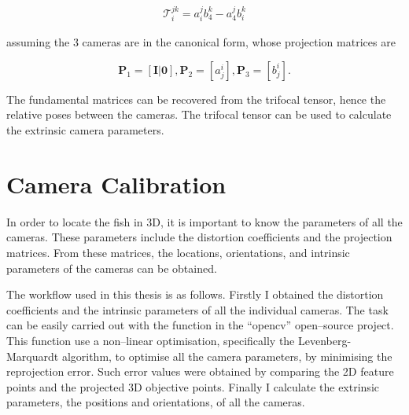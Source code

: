 \documentclass[11pt,twoside]{report}
\begin{document}
$$
\begin{aligned}
	\mathcal{T}_i^{jk} = a_i^j b_4^k - a_4^j b_i^k
\end{aligned}
$$

\noindent assuming the 3 cameras are in the canonical form, whose projection matrices are

$$
\mathbf{P}_1 = [\mathbf{I} | \mathbf{0}],
\mathbf{P}_2 = [a_j^i],
\mathbf{P}_3 = [b_j^i].
$$

The fundamental matrices can be recovered from the trifocal tensor, hence the relative poses between the cameras. The trifocal tensor can be used to calculate the extrinsic camera parameters.

\section{Camera Calibration}
\label{section:calibration}

In order to locate the fish in 3D, it is important to know the parameters of all the cameras. These parameters include the distortion coefficients and the projection matrices. From these matrices, the locations, orientations, and intrinsic parameters of the cameras can be obtained.

The workflow used in this thesis is as follows. Firstly I obtained the distortion coefficients and the intrinsic parameters of all the individual cameras. The task can be easily carried out with the  function in the ``opencv'' open--source project. This function use a non--linear optimisation, specifically the Levenberg-Marquardt algorithm, to optimise all the camera parameters, by minimising the reprojection error. Such error values were obtained by comparing the 2D feature points and the projected 3D objective points. Finally I calculate the extrinsic parameters, the positions and orientations, of all the cameras.
\end{document}
